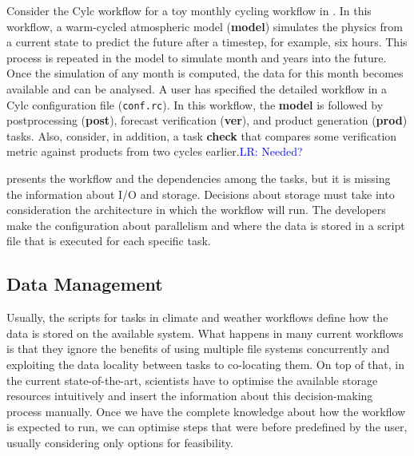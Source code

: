 \documentclass{superfri}
\newcommand{\lr}[1]{\textcolor{blue}{LR: #1}}
\begin{document}
Consider the Cylc workflow for a toy monthly cycling workflow in  \cite{8675433}.
In this workflow, a warm-cycled atmospheric model (\textbf{model}) simulates the physics from a current state to predict the future after a timestep, for example, six hours.
This process is repeated in the model to simulate month and years into the future.
Once the simulation of any month is computed, the data for this month becomes available and can be analysed.
A user has specified the detailed workflow in a Cylc configuration file (\texttt{conf.rc}).
In this workflow, the \textbf{model} is followed by postprocessing (\textbf{post}), forecast verification (\textbf{ver}), and product generation (\textbf{prod}) tasks.
Also, consider, in addition, a task \textbf{check} that compares some verification metric against products from two cycles earlier.\lr{Needed?}


 presents the workflow and the dependencies among the tasks, but it is missing the information about I/O and storage.
Decisions about storage must take into consideration the architecture in which the workflow will run.
The developers make the configuration about parallelism and where the data is stored in a script file that is executed for each specific task.

\subsection{Data Management}
\label{sec:datamanagement}

Usually, the scripts for tasks in climate and weather workflows define how the data is stored on the available system.
What happens in many current workflows is that they ignore the benefits of using multiple file systems concurrently and exploiting the data locality between tasks to co-locating them.
On top of that, in the current state-of-the-art, scientists have to optimise the available storage resources intuitively and insert the information about this decision-making process manually.
Once we have the complete knowledge about how the workflow is expected to run, we can optimise steps that were before predefined by the user, usually considering only options for feasibility.
\end{document}
